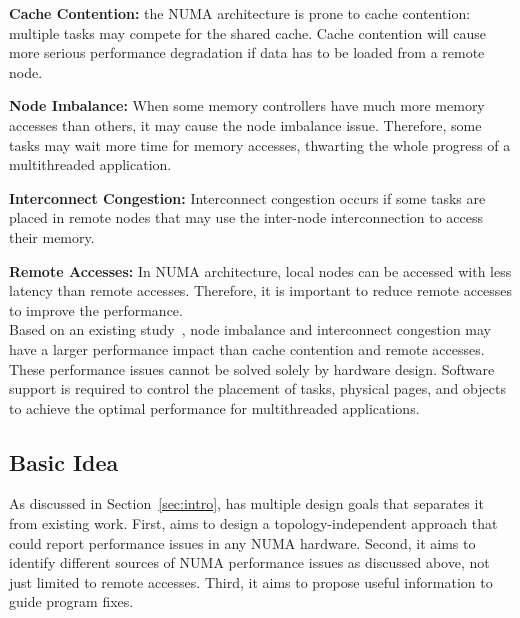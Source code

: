 \textbf{Cache Contention:} the NUMA architecture is prone to cache contention: multiple tasks may compete for the shared cache. Cache contention will cause more serious performance degradation if data has to be loaded from a remote node. 
 
\textbf{Node Imbalance:} When some memory controllers have much more memory accesses than others, it may cause the node imbalance issue. Therefore, some tasks may wait more time for memory accesses, thwarting the whole progress of a multithreaded application.  

\textbf{Interconnect Congestion:} Interconnect congestion occurs if some tasks are placed in remote nodes that may use the inter-node interconnection to access their memory. 

\textbf{Remote Accesses:} In NUMA architecture, local nodes can be accessed with less latency than remote accesses. Therefore, it is important to reduce remote accesses to improve the performance.\\


Based on an existing study~\cite{Blagodurov:2011:CNC:2002181.2002182}, node imbalance and interconnect congestion may have a larger performance impact than cache contention and remote accesses. These performance issues cannot be solved solely by hardware design. Software support is required to control the placement of tasks, physical pages, and objects to achieve the optimal performance for multithreaded applications.  
 
\subsection{Basic Idea}
\label{sec:idea}




As discussed in Section~\ref{sec:intro}, \NP{} has multiple design goals that separates it from existing work. First, \NP{} aims to design a topology-independent approach that could report performance issues in any NUMA hardware. Second, it aims to identify different sources of NUMA performance issues as discussed above, not just limited to remote accesses. Third, it aims to propose useful information to guide program fixes.  


